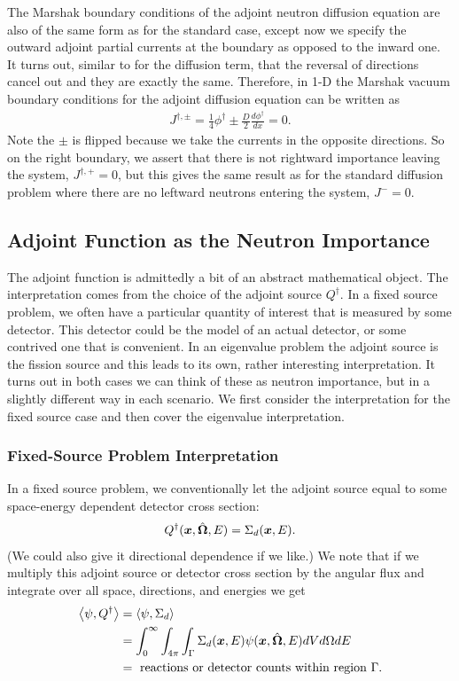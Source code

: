The Marshak boundary conditions of the adjoint neutron diffusion equation are also of the same form as for the standard case, except now we specify the outward adjoint partial currents at the boundary as opposed to the inward one. It turns out, similar to for the diffusion term, that the reversal of directions cancel out and they are exactly the same. Therefore, in 1-D the Marshak vacuum boundary conditions for the adjoint diffusion equation can be written as
\begin{align}
  J^{\dagger,\pm} = \frac{1}{4} \phi^\dagger \pm \frac{D}{2} \frac{d\phi^\dagger}{dx} = 0.
\end{align}
Note the $\pm$ is flipped because we take the currents in the opposite directions. So on the right boundary, we assert that there is not rightward importance leaving the system, $J^{\dagger,+} = 0$, but this gives the same result as for the standard diffusion problem where there are no leftward neutrons entering the system, $J^- = 0$.

\subsection{Adjoint Function as the Neutron Importance}

The adjoint function is admittedly a bit of an abstract mathematical object. The interpretation comes from the choice of the adjoint source $Q^\dagger$. In a fixed source problem, we often have a particular quantity of interest that is measured by some detector. This detector could be the model of an actual detector, or some contrived one that is convenient. In an eigenvalue problem the adjoint source is the fission source and this leads to its own, rather interesting interpretation. It turns out in both cases we can think of these as neutron importance, but in a slightly different way in each scenario. We first consider the interpretation for the fixed source case and then cover the eigenvalue interpretation.

\subsubsection{Fixed-Source Problem Interpretation}

In a fixed source problem, we conventionally let the adjoint source equal to some space-energy dependent detector cross section:
\begin{align}
  Q^\dagger(\bm{x},\hat{\mathbf{\Omega}},E) = \Sigma_d(\bm{x},E) .
\end{align}
(We could also give it directional dependence if we like.) We note that if we multiply this adjoint source or detector cross section by the angular flux and integrate over all space, directions, and energies we get
\begin{align}
  \left< \psi, Q^\dagger \right> 
  &=  \left< \psi, \Sigma_d \right> \nonumber \\
  &= \int_0^\infty \int_{4\pi} \int_\Gamma \Sigma_d(\bm{x},E) \psi(\bm{x},\hat{\mathbf{\Omega}},E) dV d\Omega dE \nonumber \\
  &= \text{ reactions or detector counts within region $\Gamma$.}
\end{align}

